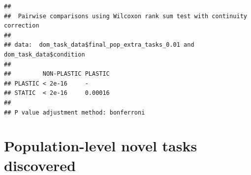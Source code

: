 \documentclass[]{book}
\newenvironment{Shaded}{\begin{snugshade}}{\end{snugshade}}
\newcommand{\DataTypeTok}[1]{\textcolor[rgb]{0.13,0.29,0.53}{#1}}
\newcommand{\FloatTok}[1]{\textcolor[rgb]{0.00,0.00,0.81}{#1}}
\newcommand{\KeywordTok}[1]{\textcolor[rgb]{0.13,0.29,0.53}{\textbf{#1}}}
\newcommand{\NormalTok}[1]{#1}
\newcommand{\OperatorTok}[1]{\textcolor[rgb]{0.81,0.36,0.00}{\textbf{#1}}}
\newcommand{\OtherTok}[1]{\textcolor[rgb]{0.56,0.35,0.01}{#1}}
\newcommand{\StringTok}[1]{\textcolor[rgb]{0.31,0.60,0.02}{#1}}
\begin{document}
\begin{Shaded}
\end{Shaded}

\begin{verbatim}
## 
##  Pairwise comparisons using Wilcoxon rank sum test with continuity correction 
## 
## data:  dom_task_data$final_pop_extra_tasks_0.01 and dom_task_data$condition 
## 
##         NON-PLASTIC PLASTIC
## PLASTIC < 2e-16     -      
## STATIC  < 2e-16     0.00016
## 
## P value adjustment method: bonferroni
\end{verbatim}

\hypertarget{population-level-novel-tasks-discovered}{%
\section{Population-level novel tasks discovered}\label{population-level-novel-tasks-discovered}}
\end{document}
